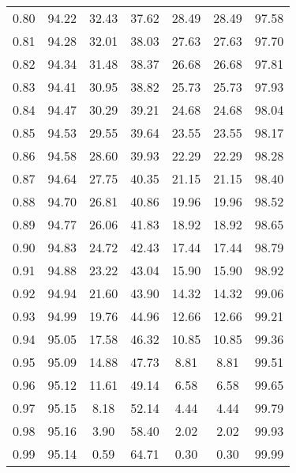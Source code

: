 \begin{tabular}{|c|c|c|c|c|c|c|}
      0.80 &     94.22 &     32.43 &      37.62 &   28.49 &      28.49 &         97.58 \\
      0.81 &     94.28 &     32.01 &      38.03 &   27.63 &      27.63 &         97.70 \\
      0.82 &     94.34 &     31.48 &      38.37 &   26.68 &      26.68 &         97.81 \\
      0.83 &     94.41 &     30.95 &      38.82 &   25.73 &      25.73 &         97.93 \\
      0.84 &     94.47 &     30.29 &      39.21 &   24.68 &      24.68 &         98.04 \\
      0.85 &     94.53 &     29.55 &      39.64 &   23.55 &      23.55 &         98.17 \\
      0.86 &     94.58 &     28.60 &      39.93 &   22.29 &      22.29 &         98.28 \\
      0.87 &     94.64 &     27.75 &      40.35 &   21.15 &      21.15 &         98.40 \\
      0.88 &     94.70 &     26.81 &      40.86 &   19.96 &      19.96 &         98.52 \\
      0.89 &     94.77 &     26.06 &      41.83 &   18.92 &      18.92 &         98.65 \\
      0.90 &     94.83 &     24.72 &      42.43 &   17.44 &      17.44 &         98.79 \\
      0.91 &     94.88 &     23.22 &      43.04 &   15.90 &      15.90 &         98.92 \\
      0.92 &     94.94 &     21.60 &      43.90 &   14.32 &      14.32 &         99.06 \\
      0.93 &     94.99 &     19.76 &      44.96 &   12.66 &      12.66 &         99.21 \\
      0.94 &     95.05 &     17.58 &      46.32 &   10.85 &      10.85 &         99.36 \\
      0.95 &     95.09 &     14.88 &      47.73 &    8.81 &       8.81 &         99.51 \\
      0.96 &     95.12 &     11.61 &      49.14 &    6.58 &       6.58 &         99.65 \\
      0.97 &     95.15 &      8.18 &      52.14 &    4.44 &       4.44 &         99.79 \\
      0.98 &     95.16 &      3.90 &      58.40 &    2.02 &       2.02 &         99.93 \\
      0.99 &     95.14 &      0.59 &      64.71 &    0.30 &       0.30 &         99.99 \\
\bottomrule
\end{tabular}
